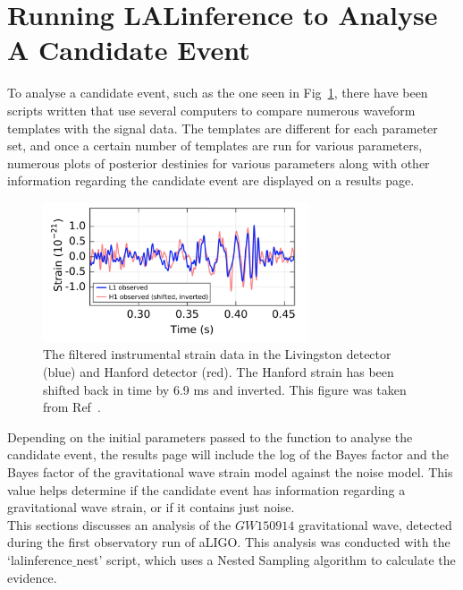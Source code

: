 \documentclass{article}
\begin{document}
  
 
 \newpage
 \section{Running LALinference to Analyse A Candidate Event}
 
 To analyse a candidate event, such as the one seen in Fig~\ref{Fig:DataLH}, there have been scripts written that use several computers to compare numerous waveform templates with the signal data. The templates are different for each parameter set, and once a certain number of templates are run for various parameters, numerous plots of posterior destinies for various parameters along with other information regarding the candidate event are displayed on a results page. \\
 


\begin{figure}[h]
	\centering
	\includegraphics[width=0.7\textwidth]{Figures/DataLH.png} 
	\caption{The filtered instrumental strain data in the Livingston detector (blue) and Hanford detector (red). The Hanford strain has been shifted back in time by 6.9 ms and inverted. This figure was taken from Ref~\cite{ligo2016properties}.
	}
	\label{Fig:DataLH}
\end{figure}
 
 Depending on the initial parameters passed to the function to analyse the candidate event, the results page will include the log of the Bayes factor and the Bayes factor of the gravitational wave strain model against the noise model. This value helps determine if the candidate event has information regarding a gravitational wave strain, or if it contains just noise. \\
 
 
 This sections discusses an analysis of the $GW150914$ gravitational wave, detected during the first observatory run of aLIGO. This analysis was conducted with the `lalinference$\_$nest' script, which uses a Nested Sampling algorithm to calculate the evidence. \\
 
\end{document}
